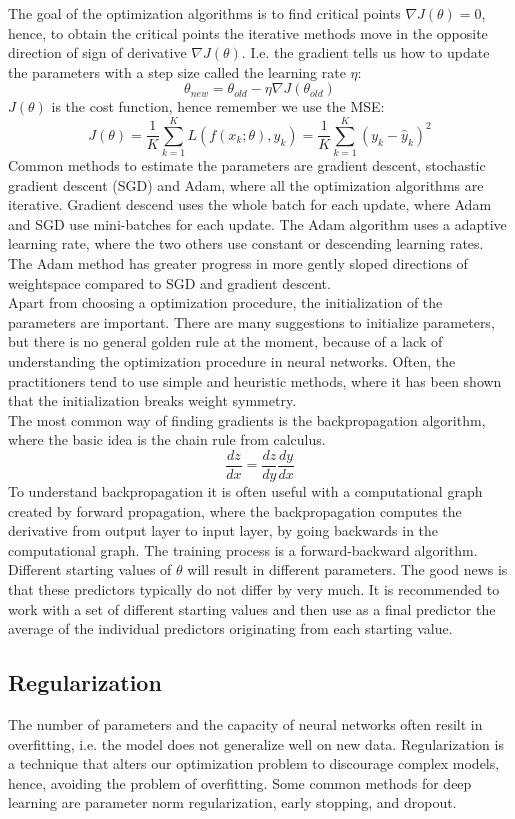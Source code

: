 The goal of the optimization algorithms is to find critical points $\nabla J(\theta)=0$, hence, to obtain the critical points the iterative methods move in the opposite direction of sign of derivative $\nabla J(\theta)$. I.e. the gradient tells us how to update the parameters with a step size called the learning rate $\eta$:
$$\theta_{new}=\theta_{old} - \eta \nabla J(\theta_{old}) $$
$J(\theta)$ is the cost function, hence remember we use the MSE:
$$J(\theta)= \frac{1}{K}\sum_{k=1}^{K} L(f(x_k;\theta),y_k)=\frac{1}{K}\sum_{k=1}^{K} (y_k-\hat{y}_k)^2$$
Common methods to estimate the parameters are gradient descent, stochastic gradient descent (SGD) and Adam, where all the optimization algorithms are iterative. Gradient descend uses the whole batch for each update, where Adam and SGD use mini-batches for each update. The Adam algorithm uses a adaptive learning rate, where the two others use constant or descending learning rates. The Adam method has greater progress in more gently sloped directions of weightspace compared to SGD and gradient descent. \\

Apart from choosing a optimization procedure, the initialization of the parameters are important. There are many suggestions to initialize parameters, but there is no general golden rule at the moment, because of a lack of understanding the optimization procedure in neural networks. Often, the practitioners tend to use simple and heuristic methods, where it has been shown that the initialization breaks weight symmetry.\\

The most common way of finding gradients is the backpropagation algorithm, where the basic idea is the chain rule from calculus.
$$\frac{dz}{dx}= \frac{dz}{dy} \frac{dy}{dx}$$
To understand backpropagation it is often useful with a computational graph created by forward propagation, where the backpropagation computes the derivative from output layer to input layer, by going backwards in the computational graph. The training process is a forward-backward algorithm. Different starting values of $\theta$ will result in different parameters. The good news is that these predictors typically do not differ by very much. It is recommended to work with a set of different starting values and then use as a final predictor the average of the individual predictors originating from each starting value.

\subsection{Regularization}\label{regularization}
The number of parameters and the capacity of neural networks often resilt in overfitting, i.e. the model does not generalize well on new data. Regularization is a technique that alters our optimization problem to discourage complex models, hence, avoiding the problem of overfitting. Some common methods for deep learning are parameter norm regularization, early stopping, and dropout.\\

